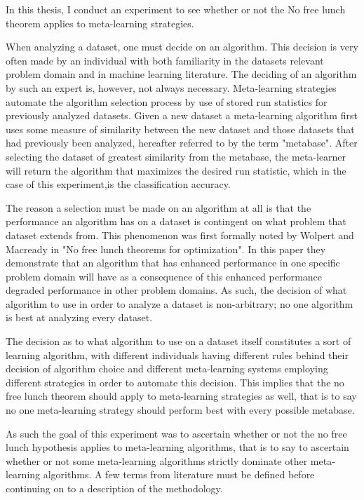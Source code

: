 \documentclass{article}
\begin{document}
In this thesis, I conduct an experiment to see whether or not the
No free lunch theorem applies to meta-learning strategies.

When analyzing a dataset, one must decide on an algorithm. This
decision is very often made by an individual with both familiarity in the
datasets relevant problem domain and in machine learning literature.
The deciding of an algorithm by such an expert is, however, not always necessary.
Meta-learning strategies automate the algorithm selection process by use of
stored run statistics for previously analyzed datasets. Given a new dataset a
meta-learning algorithm first uses some measure of similarity between the new
dataset and those datasets that had previously been analyzed, hereafter
referred to by the term "metabase". After selecting the dataset of greatest
similarity from the metabase, the meta-learner will return the algorithm that
maximizes the desired run statistic, which in the case of this experiment,is
the classification accuracy.

The reason a selection must be made on an algorithm at all is that the
performance an algorithm has on a dataset is contingent on what problem that
dataset extends from. This phenomenon was first formally noted by Wolpert and
Macready in "No free lunch theorems for optimization". In this paper they
demonstrate that an algorithm that has enhanced performance in one specific
problem domain will have as a consequence of this enhanced performance degraded
performance in other problem domains. As such, the decision of what algorithm to
use in order to analyze a dataset is non-arbitrary; no one algorithm is best at
analyzing every dataset.

The decision as to what algorithm to use on a dataset itself constitutes a sort
of learning algorithm, with different individuals having different rules behind
their decision of algorithm choice and different meta-learning systems employing
different strategies in order to automate this decision. This implies that the
no free lunch theorem should apply to meta-learning strategies as well, that is
to say no one meta-learning strategy should perform best with every possible
metabase.

As such the goal of this experiment was  to ascertain whether or not the no free
lunch hypothesis applies to meta-learning algorithms, that is to say to
ascertain whether or not some meta-learning algorithms strictly dominate other
meta-learning algorithms.
A few terms from literature must be defined before continuing on to a
description of the methodology.
\end{document}
